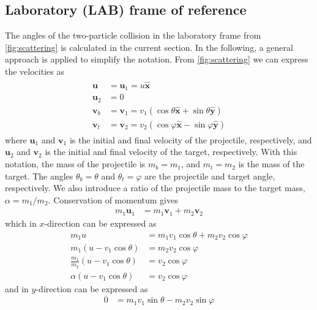 \documentclass[twoside,english]{uiofysmaster/uiofysmaster}
\let\orgautoref\autoref
\renewcommand{\autoref}
        {%
		 \def\sectionautorefname{Section}%
		 \def\subsectionautorefname{Section}%
		 \def\subsubsectionautorefname{Section}%
		 \def\chapterautorefname{Chapter}%
          \orgautoref}
\begin{document}
\begin{appendices}
\section{Laboratory (LAB) frame of reference}\label{sec:LAB}
The angles of the two-particle collision in the laboratory frame from \autoref{fig:scattering} is calculated in the current section. 
In the following, a general approach is applied to simplify the notation. 
From \autoref{fig:scattering} we can express the velocities as
\begin{align}\label{eq:2p-LAB-collision}
\begin{split}
	 \boldsymbol{u} &= \boldsymbol{u}_1 = u \boldsymbol{\hat{x}}  \\
	 \boldsymbol{u}_2 &= 0  \\
	 \boldsymbol{v}_b &= \boldsymbol{v}_1 = v_1 (\cos \theta \boldsymbol{\hat{x}} + \sin \theta \boldsymbol{\hat{y}})  \\
	\boldsymbol{v}_t &= \boldsymbol{v}_2 = v_2 (\cos \varphi \boldsymbol{\hat{x}} - \sin \varphi \boldsymbol{\hat{y}})
\end{split}
\end{align}
where $\boldsymbol{u}_1$ and $\boldsymbol{v}_1$ is the initial and final velocity of the projectile, respectively, and $\boldsymbol{u}_2$ and $\boldsymbol{v}_2$ is the initial and final velocity of the target, respectively. 
With this notation, the mass of the projectile is $m_b = m_1$, and $m_t = m_2$ is the mass of the target. 
The angles $\theta_b = \theta$ and $\theta_t = \varphi$ are the projectile and target angle, respectively. 
We also introduce a ratio of the projectile mass to the target mass, $\alpha = m_1/m_2$.
Conservation of momentum gives
\begin{align*}%
	m_1 \boldsymbol{u}_1 &= m_1 \boldsymbol{v}_1 + m_2 \boldsymbol{v}_2
\end{align*}
which in $x$-direction can be expressed as
\begin{align}\label{eq:comx}
	m_1 u &= m_1 v_1 \cos \theta + m_2 v_2 \cos \varphi  \nonumber\\
	m_1 (u - v_1 \cos \theta) &= m_2 v_2 \cos \varphi  \nonumber\\
	\frac{m_1}{m_2} (u - v_1 \cos \theta) &= v_2 \cos \varphi  \nonumber\\
	\alpha (u - v_1 \cos \theta) &= v_2 \cos \varphi
\end{align}
and in $y$-direction can be expressed as
\begin{align}\label{eq:comy}
	0 &= m_1 v_1 \sin \theta - m_2 v_2 \sin \varphi \nonumber\\

\end{align}
\end{appendices}
\end{document}
